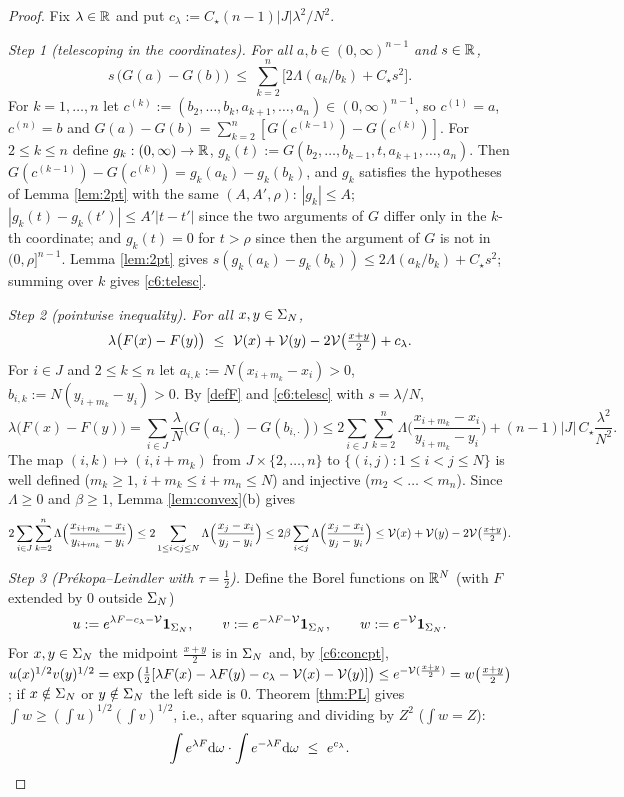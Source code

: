 \begin{proof}
Fix $\lambda\in\mathbb{R}$ and put $c_\lambda:=C_\star(n-1)|J|\lambda^2/N^2$.

\emph{Step 1 (telescoping in the coordinates).} \emph{For all $a,b\in(0,\infty)^{n-1}$ and $s\in\mathbb{R}$,}
\begin{equation}\label{c6:telesc}
s\,\big(G(a)-G(b)\big)\ \le\ \sum_{k=2}^n\Big[2\Lambda(a_k/b_k)+C_\star s^2\Big].
\end{equation}
For $k=1,\dots,n$ let $c^{(k)}:=(b_2,\dots,b_k,a_{k+1},\dots,a_n)\in(0,\infty)^{n-1}$, so $c^{(1)}=a$, $c^{(n)}=b$ and $G(a)-G(b)=\sum_{k=2}^n[G(c^{(k-1)})-G(c^{(k)})]$.
For $2\le k\le n$ define $g_k:(0,\infty)\to\mathbb{R}$, $g_k(t):=G(b_2,\dots,b_{k-1},t,a_{k+1},\dots,a_n)$. Then $G(c^{(k-1)})-G(c^{(k)})=g_k(a_k)-g_k(b_k)$, and $g_k$ satisfies the hypotheses of Lemma \ref{lem:2pt} with the same $(A,A',\rho)$: $|g_k|\le A$; $|g_k(t)-g_k(t')|\le A'|t-t'|$ since the two arguments of $G$ differ only in the $k$-th coordinate; and $g_k(t)=0$ for $t>\rho$ since then the argument of $G$ is not in $(0,\rho]^{n-1}$.
Lemma \ref{lem:2pt} gives $s(g_k(a_k)-g_k(b_k))\le2\Lambda(a_k/b_k)+C_\star s^2$; summing over $k$ gives \eqref{c6:telesc}.

\emph{Step 2 (pointwise inequality).} \emph{For all $x,y\in\Sigma_N$,}
\begin{equation}\label{c6:concpt}
\lambda\big(F(x)-F(y)\big)\ \le\ \cV(x)+\cV(y)-2\cV\big(\tfrac{x+y}2\big)+c_\lambda .
\end{equation}
For $i\in J$ and $2\le k\le n$ let $a_{i,k}:=N(x_{i+m_k}-x_i)>0$, $b_{i,k}:=N(y_{i+m_k}-y_i)>0$. By \eqref{defF} and \eqref{c6:telesc} with $s=\lambda/N$,
\[\lambda\big(F(x)-F(y)\big)=\sum_{i\in J}\frac\lambda N\big(G(a_{i,\cdot})-G(b_{i,\cdot})\big)\le2\sum_{i\in J}\sum_{k=2}^n\Lambda\Big(\frac{x_{i+m_k}-x_i}{y_{i+m_k}-y_i}\Big)+(n-1)|J|\,C_\star\frac{\lambda^2}{N^2}.\]
The map $(i,k)\mapsto(i,i+m_k)$ from $J\times\{2,\dots,n\}$ to $\{(i,j):1\le i<j\le N\}$ is well defined ($m_k\ge1$, $i+m_k\le i+m_n\le N$) and injective ($m_2<\dots<m_n$). Since $\Lambda\ge0$ and $\beta\ge1$, Lemma \ref{lem:convex}(b) gives
\[2\sum_{i\in J}\sum_{k=2}^n\Lambda\Big(\frac{x_{i+m_k}-x_i}{y_{i+m_k}-y_i}\Big)\le2\sum_{1\le i<j\le N}\Lambda\Big(\frac{x_j-x_i}{y_j-y_i}\Big)\le2\beta\sum_{i<j}\Lambda\Big(\frac{x_j-x_i}{y_j-y_i}\Big)\le\mathcal{V}(x)+\mathcal{V}(y)-2\mathcal{V}\big(\tfrac{x+y}2\big).\]

\emph{Step 3 (Pr\'ekopa--Leindler with $\tau=\frac12$).} Define the Borel functions on $\mathbb{R}^N$ (with $F$ extended by $0$ outside $\Sigma_N$)
\[u:=e^{\lambda F-c_\lambda-\mathcal{V}}\mathbf 1_{\Sigma_N},\qquad v:=e^{-\lambda F-\mathcal{V}}\mathbf 1_{\Sigma_N},\qquad w:=e^{-\mathcal{V}}\mathbf 1_{\Sigma_N}.\]
For $x,y\in\Sigma_N$ the midpoint $\frac{x+y}2$ is in $\Sigma_N$ and, by \eqref{c6:concpt},
$u(x)^{1/2}v(y)^{1/2}=\exp\big(\tfrac12[\lambda F(x)-\lambda F(y)-c_\lambda-\mathcal{V}(x)-\mathcal{V}(y)]\big)\le e^{-\mathcal{V}(\frac{x+y}2)}=w\big(\tfrac{x+y}2\big)$;
if $x\notin\Sigma_N$ or $y\notin\Sigma_N$ the left side is $0$. Theorem \ref{thm:PL} gives $\int w\ge(\int u)^{1/2}(\int v)^{1/2}$, i.e., after squaring and dividing by $Z^2$ ($\int w=Z$):
\begin{equation}\label{c6:concprod}
\int e^{\lambda F}\rd\omega\cdot\int e^{-\lambda F}\rd\omega\ \le\ e^{c_\lambda}.
\end{equation}


\end{proof}
